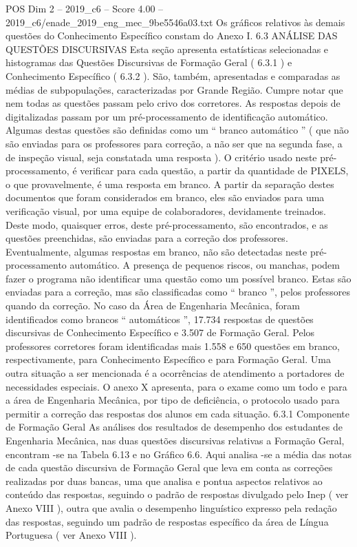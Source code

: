 \begin{textsample}{POS Dim 2 – 2019\_c6 – Score 4.00 – 2019\_c6/enade\_2019\_eng\_mec\_9be5546a03.txt}
Os gráficos relativos às demais questões do Conhecimento Específico constam do Anexo I. 6.3 ANÁLISE DAS QUESTÕES DISCURSIVAS Esta seção apresenta estatísticas selecionadas e histogramas das Questões Discursivas de Formação Geral ( 6.3.1 ) e Conhecimento Específico ( 6.3.2 ).
São, também, apresentadas e comparadas as médias de subpopulações, caracterizadas por Grande Região.
Cumpre notar que nem todas as questões passam pelo crivo dos corretores.
As respostas depois de digitalizadas passam por um pré-processamento de identificação automático.
Algumas destas questões são definidas como um “ branco automático ” ( que não são enviadas para os professores para correção, a não ser que na segunda fase, a de inspeção visual, seja constatada uma resposta ).
O critério usado neste pré-processamento, é verificar para cada questão, a partir da quantidade de PIXELS, o que provavelmente, é uma resposta em branco.
A partir da separação destes documentos que foram considerados em branco, eles são enviados para uma verificação visual, por uma equipe de colaboradores, devidamente treinados.
Deste modo, quaisquer erros, deste pré-processamento, são encontrados, e as questões preenchidas, são enviadas para a correção dos professores.
Eventualmente, algumas respostas em branco, não são detectadas neste pré-processamento automático.
A presença de pequenos riscos, ou manchas, podem fazer o programa não identificar uma questão como um possível branco.
Estas são enviadas para a correção, mas são classificadas como “ branco ”, pelos professores quando da correção.
No caso da Área de Engenharia Mecânica, foram identificados como brancos “ automáticos ”, 17.734 respostas de questões discursivas de Conhecimento Específico e 3.507 de Formação Geral.
Pelos professores corretores foram identificadas mais 1.558 e 650 questões em branco, respectivamente, para Conhecimento Específico e para Formação Geral.
Uma outra situação a ser mencionada é a ocorrências de atendimento a portadores de necessidades especiais.
O anexo X apresenta, para o exame como um todo e para a área de Engenharia Mecânica, por tipo de deficiência, o protocolo usado para permitir a correção das respostas dos alunos em cada situação. 6.3.1 Componente de Formação Geral As análises dos resultados de desempenho dos estudantes de Engenharia Mecânica, nas duas questões discursivas relativas a Formação Geral, encontram -se na Tabela 6.13 e no Gráfico 6.6.
Aqui analisa -se a média das notas de cada questão discursiva de Formação Geral que leva em conta as correções realizadas por duas bancas, uma que analisa e pontua aspectos relativos ao conteúdo das respostas, seguindo o padrão de respostas divulgado pelo Inep ( ver Anexo VIII ), outra que avalia o desempenho linguístico expresso pela redação das respostas, seguindo um padrão de respostas específico da área de Língua Portuguesa ( ver Anexo VIII ).

\end{textsample}

